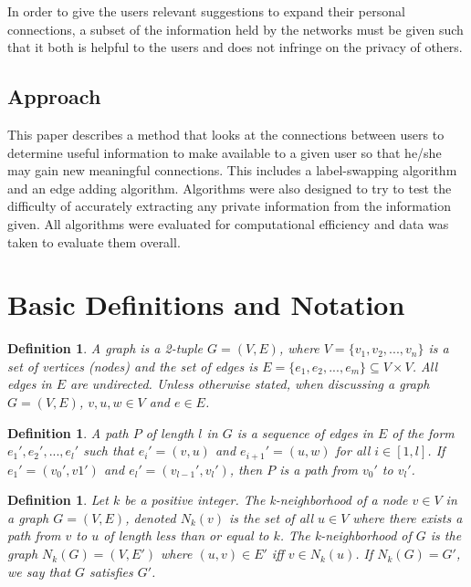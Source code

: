 \documentclass[11pt]{article}
\newtheorem{definition}[thm]{Definition}
\begin{document}
\noindent In order to give the users relevant suggestions to expand their personal connections, a subset of the information held by the networks must be given such that it both is helpful to the users and does not infringe on the  privacy of others. \\

\subsection{Approach}

\noindent This paper describes a method that looks at the connections between users to determine useful information to make available to a given user so that he/she may gain new meaningful connections. This includes a label-swapping algorithm and an edge adding algorithm. Algorithms were also designed to try to test the difficulty of accurately extracting any private information from the information given. All algorithms were evaluated for computational efficiency and data was taken to evaluate them overall.  \\

\section{Basic Definitions and Notation}

\begin{definition}
A \emph{graph} is a 2-tuple $G = (V,E)$, where $V = \{v_1,v_2,...,v_n\}$ is a set of vertices (nodes) and the set of edges is $E = \{e_1,e_2,...,e_m\} \subseteq V \times V$. All edges in $E$ are undirected. Unless otherwise stated, when discussing a graph $G=(V,E)$, $v,u,w \in V$ and $e \in E$. 
\end{definition}

\begin{definition}
 A \emph{path} $P$ of length $l$ in $G$ is a sequence of edges in $E$ of the form $e_1', e_2', ...,e_l'$ such that $e_i' = (v,u)$ and $e_{i+1}' = (u,w)$ for all $i \in [1,l]$. If $e_1' = (v_0', v1')$ and $e_l' = (v_{l-1}', v_l')$, then $P$ is a path from $v_0'$ to $v_l'$. 
\end{definition}

\begin{definition}
Let $k$ be a positive integer. The \emph{k-neighborhood} of a node $v \in V$ in a graph $G = (V,E)$, denoted $N_k(v)$ is the set of all $u \in V$ where there exists a path from $v$ to $u$ of length less than or equal to $k$. The k-neighborhood of $G$ is the graph $N_k(G) = (V, E')$ where $(u,v) \in E'$ iff $v \in N_k(u)$. If $N_k(G) = G'$, we say that $G$ \emph{satisfies} $G'$. 
\end{definition}
\end{document}
